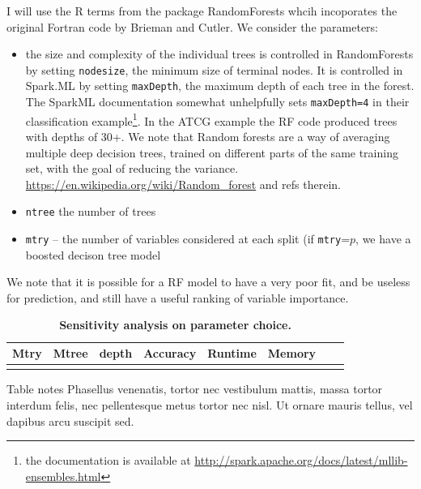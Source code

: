 \documentclass[10pt,letterpaper]{article}
\begin{document}
I will use the R terms from the package RandomForests whcih incoporates the original Fortran code by Brieman and
Cutler. We consider the parameters:
\begin{itemize}
\item the size and complexity of the individual trees is controlled in RandomForests by setting \texttt{nodesize}, the
  minimum size of terminal nodes. It is controlled in Spark.ML by setting \texttt{maxDepth}, the maximum depth of each
  tree in the forest. The SparkML documentation somewhat unhelpfully sets \texttt{maxDepth=4} in their classification
  example\footnote{the documentation is available at \url{http://spark.apache.org/docs/latest/mllib-ensembles.html} }.
  In the ATCG example the RF code produced trees with depths of 30+. We note that Random forests are a way of averaging
  multiple deep decision trees, trained on different parts of the same training set, with the goal of reducing the
  variance. \url{https://en.wikipedia.org/wiki/Random_forest} and refs therein.  
\item \texttt{ntree} the number of trees 
\item \texttt{mtry} --  the number of variables considered at each split (if \texttt{mtry}=$p$, we have a boosted decison
  tree model 
\end{itemize}

We note that it is possible for a RF model to have a very poor fit, and be useless for prediction, and still have a 
useful ranking of variable importance.



\begin{table}[!ht]
\caption{
{\bf Sensitivity analysis on parameter choice.}}
\begin{tabular}{|l|l|l|l|l|l|l|l|}
\hline
\bf{Mtry}  & \bf{Mtree} & \bf{depth} & \bf{Accuracy} & \bf{Runtime} & \bf{Memory} \\
\hline
&&&&&\\ \hline
\end{tabular}
\begin{flushleft} 
  Table notes Phasellus venenatis, tortor nec vestibulum mattis, massa tortor interdum felis, nec pellentesque metus
  tortor nec nisl. Ut ornare mauris tellus, vel dapibus arcu suscipit sed.
\end{flushleft}
\label{table2}
\end{table}
\end{document}
